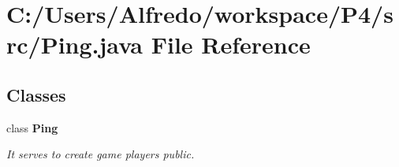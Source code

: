 \section{C\+:/\+Users/\+Alfredo/workspace/\+P4/src/\+Ping.java File Reference}
\label{_ping_8java}
\subsection*{Classes}
\begin{DoxyCompactItemize}
\item 
class {\bf Ping}
\begin{DoxyCompactList}\small\item\em It serves to create game players  public. \end{DoxyCompactList}\end{DoxyCompactItemize}
